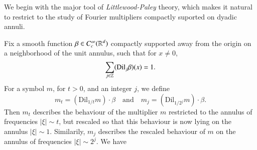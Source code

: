 We begin with the major tool of \emph{Littlewood-Paley} theory, which makes it natural to restrict to the study of Fourier multipliers compactly suported on dyadic annuli.
\begin{comment}
    We can therefore introduce the Littlewood-Paley projection operators $P_j$, which are Fourier multipliers with symbol $\text{Dil}_{2^j} \phi$. Littlewood-Paley theory guarantees that for $1 < r < \infty$,
%
\[ \| f \|_{L^r(\RR^d)} \sim_r \left( \sum_n \| P_n f \|_{L^r(\RR^d)}^2 \right)^{1/2}. \]
%
We also must introduce a slightly thickened function $\tilde{\phi} \in C_c^\infty(\RR^d)$ supported on $\{ \xi \in \RR^d: 1/4 \leq |\xi| \leq 4 \}$, equal to one on the support of $\phi$, and with $1 = \sum_j \text{Dil}_{2^j} \tilde{\phi}$, then we can introuce the Littlewood-Paley projections $\tilde{P}_j$ with symbol $\text{Dil}_{2^j} \tilde{\phi}$. For $1 < q < \infty$, we thus have
%
\[ \| m(D) f \|_{L^q(\RR^d)} \sim_q \left( \sum_j \| P_j m(D) f \|_{L^q(\RR^d)}^2 \right)^{1/2} = \left( \| P_j m(D) \{ \tilde{P}_j f \} \|_{L^q(\RR^d)}^2 \right)^{1/2}. \]
%
Now
%
\[ P_j m(D) \{ \tilde{P}_j f \} = \text{Dil}_{1/2^j} \{ m_{2^j}(D) \circ \text{Dil}_{2^j} \{ \tilde{P}_j f \} \}, \]
%
and so
%
\[ \| P_j m(D) \{ \tilde{P}_j f \} \|_{L^q(\RR^d)} = 2^{-jd/q} \| m_{2^j}(D) \text{Dil}_{2^j} \{ \tilde{P}_j f \} \|_{L^q(\RR^d)}. \]
%
We thus have
%
\begin{align*}
    \| m(D) f \|_{L^q(\RR^d)} &\lesssim_q \left( \sum_j 4^{jd(1/p - 1/q)} \| m_{2^j} \|_{M^{p,q}(\RR^d)}^2 \| \tilde{P}_j f \|_{L^p(\RR^d)}^2 \right)^{1/2}\\
    &\leq \left( \sup_t t^{d(1/p - 1/q)} \| m_t \|_{M^{p,q}(\RR^d)} \right) \left( \sum_j \| \tilde{P}_j f \|_{L^p(\RR^d)}^2 \right)^{1/2}\\
    &\sim_p \left( \sup_t t^{d(1/p - 1/q)} \| m_t \|_{M^{p,q}(\RR^d)} \right) \| f \|_{L^p(\RR^d)}.
\end{align*}
%
Moreover, this inequality is tight.
\end{comment}
Fix a smooth function $\beta \in C_c^\infty(\operatorname{\mathbb{R}}^d)$ compactly supported away from the origin on a neighborhood of the unit annulus, such that for $x \neq 0$,
%
\[ \sum_{j \in \operatorname{\mathbb{Z}}} (\text{Dil}_j \beta)(x) = 1. \]
%
For a symbol $m$, for $t > 0$, and an integer $j$, we define
%
\[ m_t = (\text{Dil}_{1/t} m) \cdot \beta \quad\text{and}\quad m_j = (\text{Dil}_{1/2^j} m) \cdot \beta. \]
%
Then $m_t$ describes the behaviour of the multiplier $m$ restricted to the annulus of frequencies $|\xi| \sim t$, but rescaled so that this behaviour is now lying on the annulus $|\xi| \sim 1$. Similarily, $m_j$ describes the rescaled behaviour of $m$ on the annulus of frequencies $|\xi| \sim 2^j$. We have
